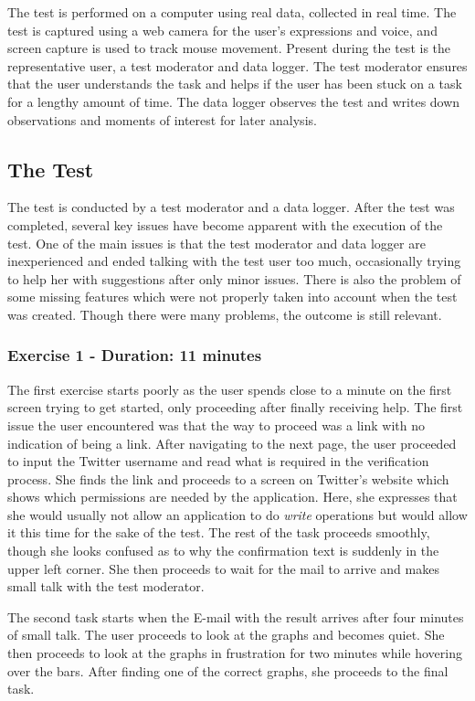 The test is performed on a computer using real data, collected in real time. The
test is captured using a web camera for the user's expressions and voice, and
screen capture is used to track mouse movement. Present during the test is the
representative user, a test moderator and data logger. The test moderator
ensures that the user understands the task and helps if the user has been
stuck on a task for a lengthy amount of time. The data logger observes the test
and writes down observations and moments of interest for later analysis.

\subsection{The Test}\label{subsec:UXTest}
The test is conducted by a test moderator and a data logger. After the test was
completed, several key issues have become apparent with the execution of the
test. One of the main issues is that the test moderator and data logger are
inexperienced and ended talking with the test user too much, occasionally
trying to help her with suggestions after only minor issues. There is also the problem
of some missing features which were not properly taken into account when the
test was created. Though there were many problems, the outcome is still
relevant.

\subsubsection{Exercise 1 - Duration: 11 minutes}
The first exercise starts poorly as the user spends close to a minute on
the first screen trying to get started, only proceeding after finally receiving help.
The first issue the user encountered was that the way to proceed was
a link with no indication of being a link. After navigating to the
next page, the user proceeded to input the Twitter username and read what is
required in the verification process. She finds the link and proceeds to
a screen on Twitter's website which shows which permissions are
needed by the application. Here, she expresses that she would usually not allow
an application to do \textit{write} operations but would allow it this time for
the sake of the test. The rest of the task proceeds smoothly, though she looks
confused as to why the confirmation text is suddenly in the upper left corner.
She then proceeds to wait for the mail to arrive and makes small talk with the test
moderator.\nl

The second task starts when the E-mail with the result arrives after four
minutes of small talk. The user proceeds to look at the graphs and becomes
quiet. She then proceeds to look at the graphs in frustration for two minutes
while hovering over the bars. After finding one of the correct graphs, she
proceeds to the final task.\nl

